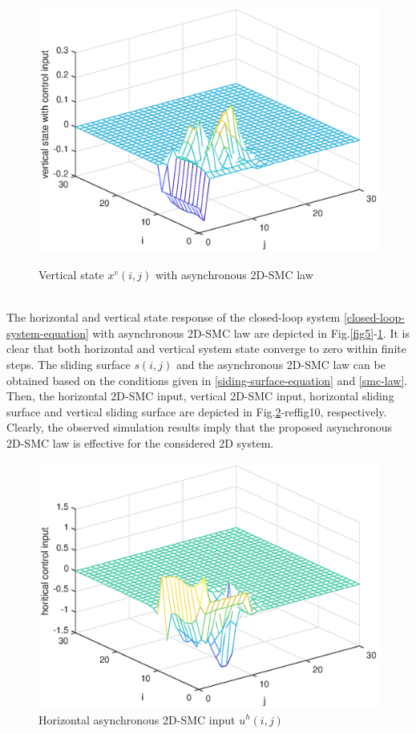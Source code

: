 \documentclass[conference]{IEEEtran}
\begin{document}
\begin{figure}[!htb]
	\centering\includegraphics[scale=0.6]{./simulations/v-state-with-force_eps.eps}\\ 
	\caption{Vertical state $x^{v}(i,j)$ with asynchronous 2D-SMC law }
	\label{fig6}
\end{figure}
\\The horizontal and vertical state response of the closed-loop system \eqref{closed-loop-system-equation} with asynchronous 2D-SMC law are depicted in Fig.\ref{fig5}-\ref{fig6}. It is clear that both horizontal and vertical system state converge to zero within finite steps. The sliding surface $s(i,j)$ and the asynchronous 2D-SMC law can be obtained based on the conditions given in \eqref{siding-surface-equation} and \eqref{smc-law}. Then, the horizontal 2D-SMC input, vertical 2D-SMC input, horizontal sliding surface and vertical sliding surface are depicted in Fig.\ref{fig7}-ref{fig10}, respectively.  Clearly, the observed simulation results imply that the proposed asynchronous 2D-SMC law is effective for the considered 2D system.
\begin{figure}[!htb]
	\centering\includegraphics[scale=0.6]{./simulations/h-control-input_eps.eps}
	\caption{Horizontal  asynchronous 2D-SMC input $u^{h}(i,j)$}
	\label{fig7}
\end{figure}
\end{document}
